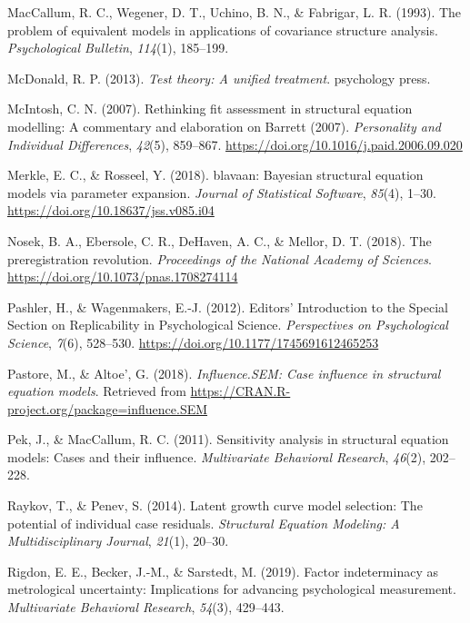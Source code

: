 \documentclass[
  english,
  man]{apa6}
\newlength{\cslhangindent}
\newenvironment{cslreferences}%
  {\setlength{\parindent}{0pt}%
  \everypar{\setlength{\hangindent}{\cslhangindent}}\ignorespaces}%
  {\par}
\begin{document}
\begin{cslreferences}
\leavevmode\hypertarget{ref-MacCallum93}{}%
MacCallum, R. C., Wegener, D. T., Uchino, B. N., \& Fabrigar, L. R. (1993). The problem of equivalent models in applications of covariance structure analysis. \emph{Psychological Bulletin}, \emph{114}(1), 185--199.

\leavevmode\hypertarget{ref-mcdonald2013test}{}%
McDonald, R. P. (2013). \emph{Test theory: A unified treatment}. psychology press.

\leavevmode\hypertarget{ref-McIntosh2007}{}%
McIntosh, C. N. (2007). Rethinking fit assessment in structural equation modelling: A commentary and elaboration on Barrett (2007). \emph{Personality and Individual Differences}, \emph{42}(5), 859--867. \url{https://doi.org/10.1016/j.paid.2006.09.020}

\leavevmode\hypertarget{ref-blavaan}{}%
Merkle, E. C., \& Rosseel, Y. (2018). blavaan: Bayesian structural equation models via parameter expansion. \emph{Journal of Statistical Software}, \emph{85}(4), 1--30. \url{https://doi.org/10.18637/jss.v085.i04}

\leavevmode\hypertarget{ref-Nosek2018}{}%
Nosek, B. A., Ebersole, C. R., DeHaven, A. C., \& Mellor, D. T. (2018). The preregistration revolution. \emph{Proceedings of the National Academy of Sciences}. \url{https://doi.org/10.1073/pnas.1708274114}

\leavevmode\hypertarget{ref-Pashler2012a}{}%
Pashler, H., \& Wagenmakers, E.-J. (2012). Editors' Introduction to the Special Section on Replicability in Psychological Science. \emph{Perspectives on Psychological Science}, \emph{7}(6), 528--530. \url{https://doi.org/10.1177/1745691612465253}

\leavevmode\hypertarget{ref-influenceSEM}{}%
Pastore, M., \& Altoe', G. (2018). \emph{Influence.SEM: Case influence in structural equation models}. Retrieved from \url{https://CRAN.R-project.org/package=influence.SEM}

\leavevmode\hypertarget{ref-pek2011sensitivity}{}%
Pek, J., \& MacCallum, R. C. (2011). Sensitivity analysis in structural equation models: Cases and their influence. \emph{Multivariate Behavioral Research}, \emph{46}(2), 202--228.

\leavevmode\hypertarget{ref-raykov2014latent}{}%
Raykov, T., \& Penev, S. (2014). Latent growth curve model selection: The potential of individual case residuals. \emph{Structural Equation Modeling: A Multidisciplinary Journal}, \emph{21}(1), 20--30.

\leavevmode\hypertarget{ref-rigdon2019factor}{}%
Rigdon, E. E., Becker, J.-M., \& Sarstedt, M. (2019). Factor indeterminacy as metrological uncertainty: Implications for advancing psychological measurement. \emph{Multivariate Behavioral Research}, \emph{54}(3), 429--443.


\end{cslreferences}
\end{document}
